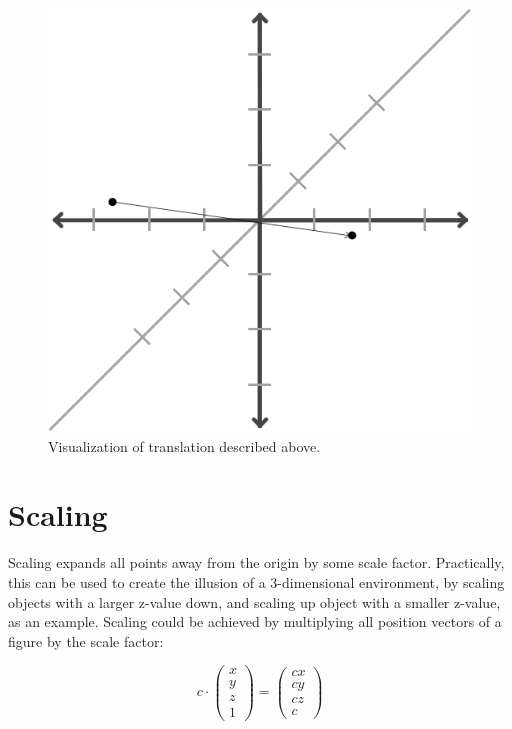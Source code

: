 \documentclass{article}
\begin{document}
	\begin{figure}[H]
		\centering
		\includegraphics{img/translation.png}
		\caption{Visualization of translation described above.}
	\end{figure}

	\section{Scaling}

	Scaling expands all points away from the origin by some scale factor. Practically, this can be used to create the illusion of a 3-dimensional environment, by scaling objects with a larger z-value down, and scaling up object with a smaller z-value, as an example. Scaling could be achieved by multiplying all position vectors of a figure by the scale factor: \par

	\[
		c \cdot
		\begin{pmatrix}
			x \\
			y \\
			z \\
			1
		\end{pmatrix}
		=
		\begin{pmatrix}
			cx \\
			cy \\
			cz \\
			c
		\end{pmatrix}
	\]
	
\end{document}
